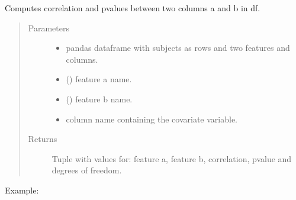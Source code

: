 \documentclass[letterpaper,10pt,english]{sphinxmanual}
\begin{document}
\begin{fulllineitems}
\label{\detokenize{_autosummary/analytics_core.analytics:analytics_core.analytics.analytics.calculate_rm_correlation}}
Computes correlation and p\sphinxhyphen{}values between two columns a and b in df.
\begin{quote}\begin{description}
\item[{Parameters}] \leavevmode\begin{itemize}
\item {} 
 \textendash{} pandas dataframe with subjects as rows and two features and columns.

\item {} 
 () \textendash{} feature a name.

\item {} 
 () \textendash{} feature b name.

\item {} 
 \textendash{} column name containing the covariate variable.

\end{itemize}

\item[{Returns}] \leavevmode
Tuple with values for: feature a, feature b, correlation, p\sphinxhyphen{}value and degrees of freedom.

\end{description}\end{quote}

Example:

\begin{sphinxVerbatim}[commandchars=\\\{\}]
     
\end{sphinxVerbatim}

\end{fulllineitems}
\end{document}
